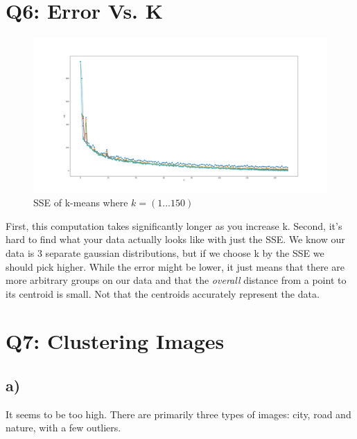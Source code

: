 \documentclass{article}
\begin{document}
    \section*{Q6: Error Vs. K}
        \begin{figure}[!h]
            \centering
            \includegraphics[width=\textwidth]{"Q6_Error_vs_k.png"}
            \caption{SSE of k-means where $k = (1 ... 150)$}
        \end{figure}   
        \qquad First, this computation takes significantly longer as you increase k. 
        Second, it's hard to find what your data actually looks like with just the SSE. We know our data is 3 separate gaussian distributions, but if we choose k by the SSE we should pick higher.
        While the error might be lower, it just means that there are more arbitrary groups on our data and that the \emph{overall} distance from a point to its centroid is small. Not that the centroids accurately represent the data.
    

    \section*{Q7: Clustering Images}
        \subsection*{a)}
        \qquad It seems to be too high. There are primarily three types of images: city, road and nature, with a few outliers.
\end{document}
